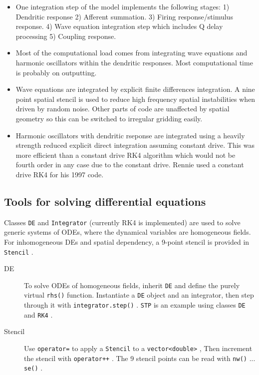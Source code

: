 \documentclass[12pt,a4paper]{article}
\newcommand{\type}[1]{ {\small\small\tt #1} }
\begin{document}
\begin{itemize}
\item One integration step of the model implements the following stages: 1) Dendritic response 2) Afferent summation. 3) Firing response/stimulus response. 4) Wave equation integration step which includes Q delay processing 5) Coupling response.
\item Most of the computational load comes from integrating wave equations and harmonic oscillators within the dendritic responses. Most computational time is probably on outputting.
\item Wave equations are integrated by explicit finite differences integration. A nine point spatial stencil is used to reduce high frequency spatial instabilities when driven by random noise. Other parts of code are unaffected by spatial geometry so this can be switched to irregular gridding easily.
\item Harmonic oscillators with dendritic rseponse are integrated using a heavily strength reduced explicit direct integration assuming constant drive. This was more efficient than a constant drive RK4 algorithm which would not be fourth order in any case due to the constant drive. Rennie used a constant drive RK4 for his 1997 code.
\end{itemize}

\subsection{Tools for solving differential equations}

Classes \type{DE} and \type{Integrator} (currently RK4 is implemented) are used to solve generic systems of ODEs, where the dynamical variables are homogeneous fields. For inhomogeneous DEs and spatial dependency, a 9-point stencil is provided in \type{Stencil}.

\begin{description}
	\item[DE] To solve ODEs of homogeneous fields, inherit \type{DE} and define the purely virtual \type{rhs()} function. Instantiate a \type{DE} object and an integrator, then step through it with \type{integrator.step()}. \type{STP} is an example using classes \type{DE} and \type{RK4}.
	\item[Stencil] Use \type{operator=} to apply a \type{Stencil} to a \type{vector<double>}, Then increment the stencil with \type{operator++}. The 9 stencil points can be read with \type{nw()} ... \type{se()}.
\end{description}
\end{document}

